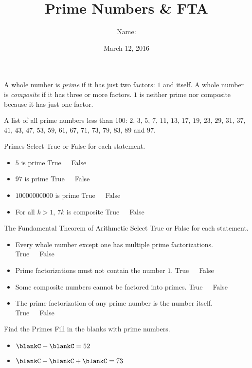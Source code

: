 \documentclass[12pt,letterpaper]{article}
\title{Prime Numbers \& FTA}
\author{Name: \underline{\hspace{5cm}}}
\date{March 12, 2016}
\begin{document}
\maketitle

\thispagestyle{empty}

A whole number is \emph{prime} if it has just two factors: $1$ and itself. A
whole number is \emph{composite} if it has three or more factors. $1$ is neither
prime nor composite because it has just one factor.

A list of all prime numbers less than $100$: $2$, $3$, $5$, $7$, $11$, $13$,
$17$, $19$, $23$, $29$, $31$, $37$, $41$, $43$, $47$, $53$, $59$, $61$, $67$,
$71$, $73$, $79$, $83$, $89$ and $97$.

\begin{problem}{Primes}
Select True or False for each statement.

\begin{itemize}
 \item $5$ is prime \hfill True~~~False
 \item $97$ is prime \hfill True~~~False
 \item $10000000000$ is prime \hfill True~~~False
 \item For all $k>1$, $7k$ is composite \hfill True~~~False
\end{itemize}
\end{problem}

\begin{problem}{The Fundamental Theorem of Arithmetic}
 Select True or False for each statement.

 \begin{itemize}
  \item Every whole number except one has multiple prime factorizations.
  \hfill True~~~False
  \item Prime factorizations must not contain the number $1$.
  \hfill True~~~False
  \item Some composite numbers cannot be factored into primes.
  \hfill True~~~False
  \item The prime factorization of any prime number is the number itself.
  \hfill True~~~False
 \end{itemize}

\end{problem}

\begin{problem}{Find the Primes}
 Fill in the blanks with prime numbers.

 \begin{itemize}
  \item $\blankC + \blankC = 52$
  \item $\blankC + \blankC + \blankC = 73$
 \end{itemize}
\end{problem}
\end{document}

